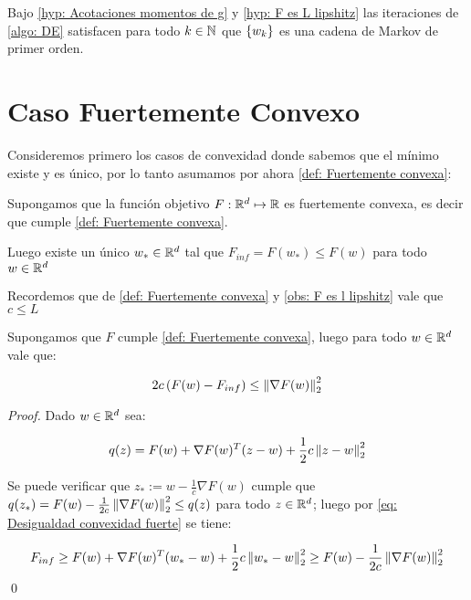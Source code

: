 \begin{corollary}
	\label{coro: DE es una cadena de markov}
	Bajo \ref{hyp: Acotaciones momentos de g} y \ref{hyp: F es L lipshitz} las iteraciones de \ref{algo: DE} satisfacen para todo $k \in {\mathbb{N}}$ que $\left\lbrace w_k\right\rbrace$ es una cadena de Markov de primer orden.
\end{corollary}

\section{Caso Fuertemente Convexo}
Consideremos primero los casos de convexidad donde sabemos que el m\'inimo existe y es \'unico, por lo tanto asumamos por ahora \ref{def: Fuertemente convexa}:

\begin{hyp}
	Supongamos que la funci\'on objetivo $F : {\mathbb{R}}^d \mapsto {\mathbb{R}}$ es fuertemente convexa, es decir que cumple \ref{def: Fuertemente convexa}.
	
	Luego existe un \'unico $w_{*} \in {\mathbb{R}}^d$ tal que $F_{inf} = F(w_*) \leq F(w)$ para todo $w \in {\mathbb{R}}^d$
	
\end{hyp}

Recordemos que de \ref{def: Fuertemente convexa} y \ref{obs: F es l lipshitz} vale que $c \leq L$ 

\begin{lemma}
	\label{eq: Desigualdad convexidad fuerte}
	Supongamos que $F$ cumple \ref{def: Fuertemente convexa}, luego para todo $w \in {\mathbb{R}}^d$ vale que:
	
	\begin{equation}
		2c\left(F(w) - F_{inf}\right) \leq \left\lVert\nabla F(w)\right\rVert_2^2
	\end{equation}
	
\end{lemma}

\begin{proof}
	Dado $w \in {\mathbb{R}}^d$ sea:
	
	\begin{equation*}
		q(z) = F(w) + \nabla F(w)^T (z-w) + \frac{1}{2} c \left\lVert z-w\right\rVert_2^2
	\end{equation*}
	
	Se puede verificar que $z_* := w - \frac{1}{c} \nabla F(w)$ cumple que $q(z_*) = F(w) - \frac{1}{2c} \left\lVert\nabla F(w)\right\rVert_2^2 \leq q(z)$ para todo $z \in {\mathbb{R}}^d$; luego por \ref{eq: Desigualdad convexidad fuerte} se tiene:
	
	\begin{equation*}
		F_{inf} \geq F(w) + \nabla F(w)^T (w_*-w) + \frac{1}{2} c \left\lVert w_*-w\right\rVert_2^2 \geq F(w) - \frac{1}{2c} \left\lVert\nabla F(w)\right\rVert_2^2 
	\end{equation*}
	\qed
\end{proof}

